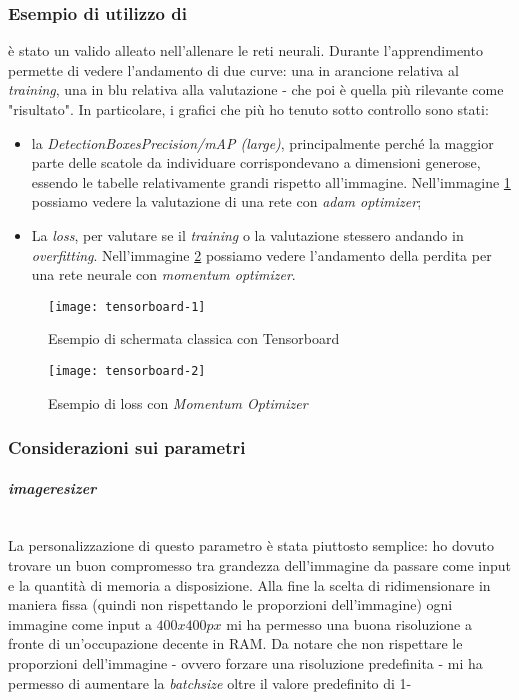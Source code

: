         \subsubsection{Esempio di utilizzo di }
         è stato un valido alleato nell'allenare le reti neurali. Durante l'apprendimento permette di vedere l'andamento di due curve: una in arancione relativa al \textit{training}, una in blu relativa alla valutazione - che poi è quella più rilevante come "risultato". In particolare, i grafici che più ho tenuto sotto controllo sono stati:
        \begin{itemize}
            \item la \textit{DetectionBoxes\textunderscore Precision/mAP (large)}, principalmente perché la maggior parte delle scatole da individuare corrispondevano a dimensioni generose, essendo le tabelle relativamente grandi rispetto all'immagine. Nell'immagine \ref{img:example_tensorboard_1} possiamo vedere la valutazione di una rete con \textit{adam optimizer};
            \item La \textit{loss}, per valutare se il \textit{training} o la valutazione stessero andando in \textit{overfitting}. Nell'immagine \ref{img:example_tensorboard_2} possiamo vedere l'andamento della perdita per una rete neurale con \textit{momentum optimizer}.
        \end{itemize}
        \begin{figure}[!h] 
            \centering
            \texttt{[image: tensorboard-1]} 
            \caption{Esempio di schermata classica con Tensorboard}
            \label{img:example_tensorboard_1}
        \end{figure}
        \begin{figure}[!h] 
        \centering
        \texttt{[image: tensorboard-2]} 
        \caption{Esempio di loss con \textit{Momentum Optimizer}}
        \label{img:example_tensorboard_2}
        \end{figure}
        
        \subsubsection{Considerazioni sui parametri}
        \paragraph{\textit{image\textunderscore resizer}}
        ~\\La personalizzazione di questo parametro è stata piuttosto semplice: ho dovuto trovare un buon compromesso tra grandezza dell'immagine da passare come input e la quantità di memoria a disposizione. Alla fine la scelta di ridimensionare in maniera fissa (quindi non rispettando le proporzioni dell'immagine) ogni immagine come input a $400x400px$ mi ha permesso una buona risoluzione a fronte di un'occupazione decente in RAM. Da notare che non rispettare le proporzioni dell'immagine - ovvero forzare una risoluzione predefinita - mi ha permesso di aumentare la \textit{batch\textunderscore size} oltre il valore predefinito di 1-
